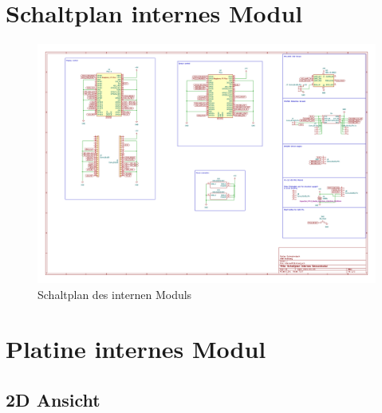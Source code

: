 \documentclass[a4paper,11pt]{article}
\begin{document}
\clearpage
\section{Schaltplan internes Modul}

\begin{figure}[H]
  \centering
  \includegraphics[scale=0.7, page=1, angle=90]{../pcbs/InternalPCB/InternalPCB.pdf}
  \caption{Schaltplan des internen Moduls}
  \label{pdf:schaltplanIntern}
\end{figure}

\clearpage
\section{Platine internes Modul}

\subsection{2D Ansicht}
\end{document}
